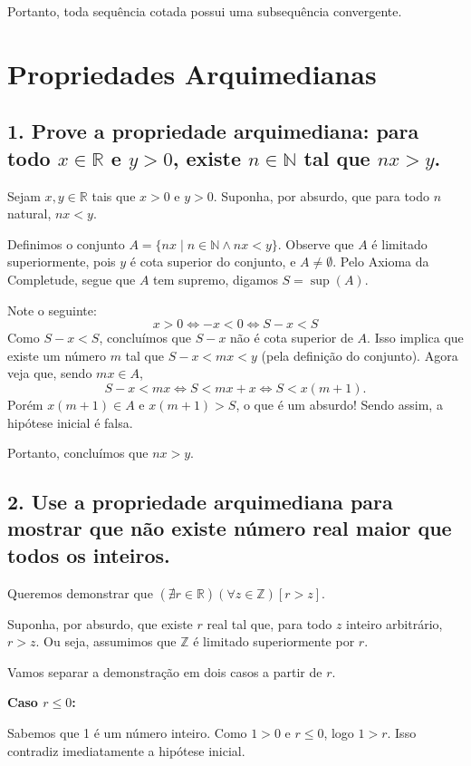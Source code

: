 \documentclass[12pt]{article}
\begin{document}
	Portanto, toda sequência cotada possui uma subsequência convergente. \blacksquare
	
	\section*{\centering Propriedades Arquimedianas}
	
	\subsection*{1. Prove a propriedade arquimediana: para todo $x \in \mathbb{R}$ e $y > 0$, existe $n \in \mathbb{N}$ tal que $nx > y$.}
	
	Sejam $x, y \in \mathbb{R}$ tais que $x > 0$ e $y > 0$. Suponha, por absurdo, que para todo $n$ natural, $nx < y$.
	
	Definimos o conjunto $A = \{nx \mid n \in \mathbb{N} \land nx < y\}$. Observe que $A$ é limitado superiormente, pois $y$ é cota superior do conjunto, e $A \neq \emptyset$. Pelo Axioma da Completude, segue que $A$ tem supremo, digamos $S = \sup(A)$.
	
	Note o seguinte:
	\[
	x > 0 \iff -x < 0 \iff S - x < S
	\]
	Como $S - x < S$, concluímos que $S - x$ não é cota superior de $A$. Isso implica que existe um número $m$ tal que $S - x < mx < y$ (pela definição do conjunto). Agora veja que, sendo $mx \in A$,
	\[
	S - x < mx \iff S < mx + x \iff S < x(m + 1).
	\]
	Porém $x(m + 1) \in A$ e $x(m + 1) > S$, o que é um absurdo! Sendo assim, a hipótese inicial é falsa.
	
	Portanto, concluímos que $nx > y$. \blacksquare
	
	\subsection*{2. Use a propriedade arquimediana para mostrar que não existe número real maior que todos os inteiros.}
	
	Queremos demonstrar que $(\nexists r \in \mathbb{R})(\forall z \in \mathbb{Z})[r > z]$.
	
	Suponha, por absurdo, que existe $r$ real tal que, para todo $z$ inteiro arbitrário, $r > z$. Ou seja, assumimos que $\mathbb{Z}$ é limitado superiormente por $r$.
	
	Vamos separar a demonstração em dois casos a partir de $r$.
	
	\textbf{Caso $r \leq 0$:}
	
	Sabemos que 1 é um número inteiro. Como $1 > 0$ e $r \leq 0$, logo $1 > r$. Isso contradiz imediatamente a hipótese inicial.
	
\end{document}
